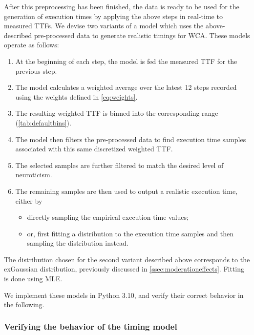 After this preprocessing has been finished, the data is ready to be used for the generation of execution times by applying the above steps in real-time to measured \acp{TTF}.
We devise two variants of a model which uses the above-described pre-processed data to generate realistic timings for \ac{WCA}.
These models operate as follows:

\begin{enumerate}
    \item At the beginning of each step, the model is fed the measured \ac{TTF} for the previous step.
    \item The model calculates a weighted average over the latest \num{12} steps recorded using the weights defined in \cref{eq:weights}.
    \item The resulting weighted \ac{TTF} is binned into the corresponding range (\cref{tab:defaultbins}).
    \item The model then filters the pre-processed data to find execution time samples associated with this same discretized weighted \ac{TTF}.
    \item The selected samples are further filtered to match the desired level of neuroticism.
    \item The remaining samples are then used to output a realistic execution time, either by
    \begin{itemize}
        \item directly sampling the empirical execution time values;
        \item or, first fitting a distribution to the execution time samples and then sampling the distribution instead.
    \end{itemize}
\end{enumerate}

The distribution chosen for the second variant described above corresponds to the \ac{exGaussian} distribution, previously discussed in \cref{ssec:moderationeffects}.
Fitting is done using \ac{MLE}.

We implement these models in Python 3.10, and verify their correct behavior in the following.


\subsubsection{Verifying the behavior of the timing model}\label{ssec:model:verification}

